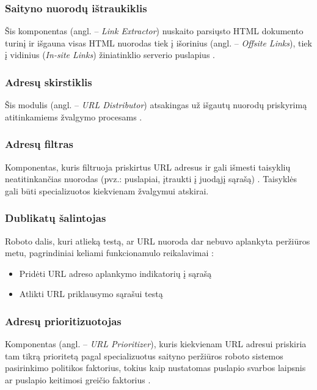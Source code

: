 \subsubsection{Saityno nuorodų ištraukiklis}

Šis komponentas (angl. -- \textit{Link Extractor}) nuskaito parsiųsto HTML dokumento turinį ir išgauna visas HTML nuorodas tiek į išorinius (angl. -- \textit{Offsite Links}), tiek į vidinius (\textit{In-site Links}) žiniatinklio serverio puslapius \cite{StanfWebCrawl}.

\subsubsection{Adresų skirstiklis}

Šis modulis (angl. -- \textit{URL Distributor}) atsakingas už išgautų nuorodų priskyrimą atitinkamiems žvalgymo procesams \cite{StanfWebCrawl}.

\subsubsection{Adresų filtras}

Komponentas, kuris filtruoja priskirtus URL adresus ir gali išmesti taisyklių neatitinkančias nuorodas (pvz.: puslapiai, įtraukti į juodąjį sąrašą) \cite{StanfWebCrawl}. Taisyklės gali būti specializuotos kiekvienam žvalgymui atskirai.

\subsubsection{Dublikatų šalintojas}

Roboto dalis, kuri atlieką testą, ar URL nuoroda dar nebuvo aplankyta peržiūros metu, pagrindiniai keliami funkcionamulo reikalavimai \cite{StanfWebCrawl}:
\begin{itemize}
    \item Pridėti URL adreso aplankymo indikatorių į sąrašą
    \item Atlikti URL priklausymo sąrašui testą
\end{itemize}

\subsubsection{Adresų prioritizuotojas}

Komponentas (angl. -- \textit{URL Prioritizer}), kuris kiekvienam URL adresui priskiria tam tikrą prioritetą pagal specializuotus saityno peržiūros roboto sistemos pasirinkimo politikos faktorius, tokius kaip nustatomas puslapio svarbos laipsnis ar puslapio keitimosi greičio faktorius \cite{StanfWebCrawl}.


